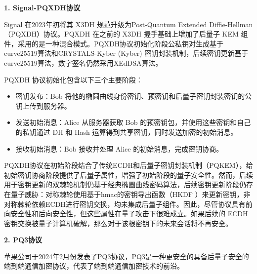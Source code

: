 \textbf{1. Signal-PQXDH协议}


Signal 在2023年初将其 X3DH 规范升级为Post-Quantum Extended Diffie-Hellman（PQXDH）协议。PQXDH 在之前的 X3DH 握手基础上增加了后量子 KEM 组件，采用的是一种混合模式。PQXDH协议初始化阶段公私钥对生成基于curve25519算法\cite{bernstein2006curve25519}和CRYSTALS-Kyber (Kyber) \cite{kyber2022}密钥封装机制，后续密钥更新基于curve25519算法，数字签名仍然采用XEdDSA算法\cite{perrin2016xeddsa}。


PQXDH 协议初始化包含以下三个主要阶段：
\begin{itemize}
    \item 密钥发布：Bob 将他的椭圆曲线身份密钥、预密钥和后量子密钥封装密钥的公钥上传到服务器。
    \item 发送初始消息：Alice 从服务器获取 Bob 的预密钥包，并使用这些密钥和自己的私钥通过 DH 和 Hash 运算得到共享密钥，同时发送加密的初始消息。
    \item 接收初始消息：Bob 接收并处理 Alice 的初始消息，完成密钥协商。
\end{itemize}


PQXDH协议在初始阶段结合了传统ECDH\cite{haakegaard2015elliptic}和后量子密钥封装机制（PQKEM），给初始密钥协商阶段提供了后量子属性，增强了初始阶段的量子安全性。然而，后续用于密钥更新的双棘轮机制仍基于经典椭圆曲线密码算法，后续密钥更新阶段仍存在量子威胁：对称棘轮使用基于hmac\cite{krawczyk1997hmac}的密钥导出函数（HKDF \cite{Kra10}）来更新密钥，非对称棘轮依赖ECDH进行密钥交换，均未集成后量子组件。因此，尽管协议具有前向安全性和后向安全性，但这些属性在量子攻击下很难成立。如果后续的 ECDH 密钥交换被量子计算机破解，那么对于该根密钥下的未来会话将不再安全。





\textbf{2. PQ3协议}

苹果公司于2024年2月份发表了PQ3协议，PQ3是一种更安全的具备后量子安全的端到端通信加密协议，代表了端到端通信加密技术的前沿。
 
